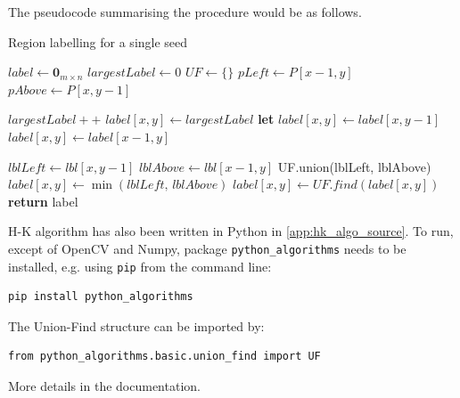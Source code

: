 \documentclass[a4paper]{article}
\begin{document}
The pseudocode summarising the procedure would be as follows. \TODO[UF structure]
\begin{algorithm}[H]
\caption{Region labelling for a single seed}\label{alg:region_growing_one_seed}
\begin{algorithmic}[1]
 
\State $label \leftarrow \textbf{0}_{m \times n}$
\State $largestLabel\leftarrow 0$
\State $UF \leftarrow \{\}$ 
            \State $pLeft \leftarrow P[x-1,y]$
            \State $pAbove \leftarrow P[x,y-1]$
            
                \State $largestLabel++ $ 
                \State $label[x,y] \leftarrow largestLabel$             
             
                \State \textbf{let} $label[x,y] \leftarrow label[x,y-1]$ 
             
                \State $label[x,y] \leftarrow label[x-1,y]$ 
            
            \Else {} 
                \State $lblLeft \leftarrow lbl[x,y-1]$
                \State $lblAbove \leftarrow lbl[x-1,y]$
                \State UF.union(lblLeft, lblAbove) 
                \State $label[x,y] \leftarrow \min(lblLeft,\, lblAbove)$
            \EndIf
        \EndIf
    \EndFor
\EndFor
\State
{}
            \State $label[x,y] \leftarrow UF.find\left(label[x,y]\right)$ 
        \EndIf
    \EndFor
\EndFor
\State \textbf{return} label
\EndProcedure
\end{algorithmic}
\end{algorithm}
\marginnote{\faCogs\ref{app:hk_algo_source}\faCogs}H-K algorithm has also been written in Python in \ref{app:hk_algo_source}. To run, except of OpenCV and Numpy, package \texttt{python_algorithms} needs to be installed, e.g. using \texttt{pip} from the command line:
\begin{verbatim}
pip install python_algorithms
\end{verbatim}
The Union-Find structure can be imported by:
\begin{verbatim}
from python_algorithms.basic.union_find import UF
\end{verbatim}
More details in the documentation.
\end{document}
